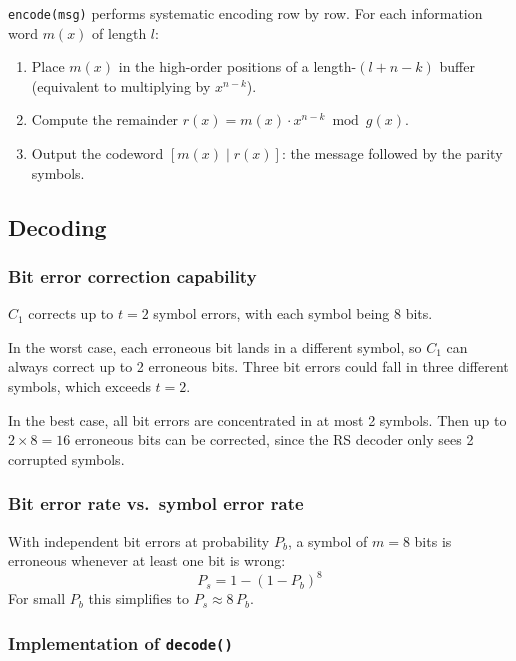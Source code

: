 \documentclass[11pt,a4paper]{article}
\begin{document}
\texttt{encode(msg)} performs systematic encoding row by row. For each information word $m(x)$ of length $l$:
\begin{enumerate}
    \item Place $m(x)$ in the high-order positions of a length-$(l + n - k)$ buffer (equivalent to multiplying by $x^{n-k}$).
    \item Compute the remainder $r(x) = m(x) \cdot x^{n-k} \bmod g(x)$.
    \item Output the codeword $[m(x) \mid r(x)]$: the message followed by the parity symbols.
\end{enumerate}

\subsection{Decoding}

\subsubsection{Bit error correction capability}

$C_1$ corrects up to $t = 2$ symbol errors, with each symbol being 8 bits.

In the worst case, each erroneous bit lands in a different symbol, so $C_1$ can always correct up to 2 erroneous bits. Three bit errors could fall in three different symbols, which exceeds $t=2$.

In the best case, all bit errors are concentrated in at most 2 symbols. Then up to $2 \times 8 = 16$ erroneous bits can be corrected, since the RS decoder only sees 2 corrupted symbols.

\subsubsection{Bit error rate vs.\ symbol error rate}

With independent bit errors at probability $P_b$, a symbol of $m = 8$ bits is erroneous whenever at least one bit is wrong:
\[
P_s = 1 - (1 - P_b)^8
\]
For small $P_b$ this simplifies to $P_s \approx 8\, P_b$.

\subsubsection{Implementation of \texttt{decode()}}
\end{document}
